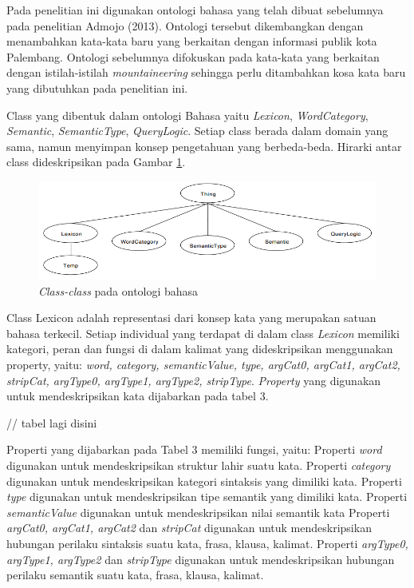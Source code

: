 	Pada penelitian ini digunakan ontologi bahasa yang telah dibuat sebelumnya pada penelitian Admojo (2013). Ontologi tersebut dikembangkan dengan menambahkan kata-kata baru yang berkaitan dengan informasi publik kota Palembang. Ontologi sebelumnya difokuskan pada kata-kata yang berkaitan dengan istilah-istilah \emph{mountaineering} sehingga perlu ditambahkan kosa kata baru yang dibutuhkan pada penelitian ini.
	
	Class yang dibentuk dalam ontologi Bahasa yaitu \emph{Lexicon}, \emph{WordCategory}, \emph{Semantic}, \emph{SemanticType}, \emph{QueryLogic}. Setiap class berada dalam domain yang sama, namun menyimpan konsep pengetahuan yang berbeda-beda. Hirarki antar class dideskripsikan pada Gambar \ref{fig:classontologibahasa}.
	
	\begin{figure}[H]
		\centering
		\includegraphics[scale=0.45]{gambar/classontologibahasa.png}
		\caption{\emph{Class-class} pada ontologi bahasa}
		\label{fig:classontologibahasa}
	\end{figure}
	
	Class Lexicon adalah representasi dari konsep kata yang merupakan satuan bahasa terkecil. Setiap individual yang terdapat di dalam class \emph{Lexicon} memiliki kategori, peran dan fungsi di dalam kalimat yang dideskripsikan menggunakan property, yaitu: \emph{word, category, semanticValue, type, argCat0, argCat1, argCat2, stripCat, argType0, argType1, argType2, stripType}. \emph{Property} yang digunakan untuk mendeskripsikan kata dijabarkan pada tabel 3.
	
	// tabel lagi disini
	
	Properti yang dijabarkan pada Tabel 3 memiliki fungsi, yaitu: Properti \emph{word} digunakan untuk mendeskripsikan struktur lahir suatu kata. Properti \emph{category} digunakan untuk mendeskripsikan kategori sintaksis yang dimiliki kata. Properti \emph{type} digunakan untuk mendeskripsikan tipe semantik yang dimiliki kata. Properti \emph{semanticValue} digunakan untuk mendeskripsikan nilai semantik kata Properti \emph{argCat0, argCat1, argCat2} dan \emph{stripCat} digunakan untuk mendeskripsikan hubungan perilaku sintaksis suatu kata, frasa, klausa, kalimat. Properti \emph{argType0, argType1, argType2} dan \emph{stripType} digunakan untuk mendeskripsikan hubungan perilaku semantik suatu kata, frasa, klausa, kalimat.
	
